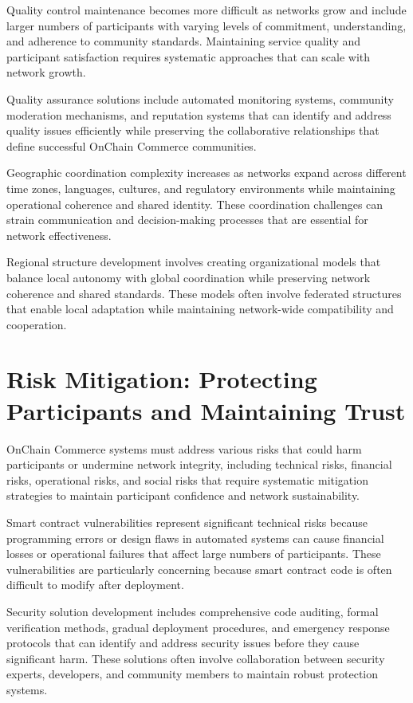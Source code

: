 \documentclass[
  Letterpaper,
]{scrbook}
\begin{document}
Quality control maintenance becomes more difficult as networks grow and
include larger numbers of participants with varying levels of
commitment, understanding, and adherence to community standards.
Maintaining service quality and participant satisfaction requires
systematic approaches that can scale with network growth.

Quality assurance solutions include automated monitoring systems,
community moderation mechanisms, and reputation systems that can
identify and address quality issues efficiently while preserving the
collaborative relationships that define successful OnChain Commerce
communities.

Geographic coordination complexity increases as networks expand across
different time zones, languages, cultures, and regulatory environments
while maintaining operational coherence and shared identity. These
coordination challenges can strain communication and decision-making
processes that are essential for network effectiveness.

Regional structure development involves creating organizational models
that balance local autonomy with global coordination while preserving
network coherence and shared standards. These models often involve
federated structures that enable local adaptation while maintaining
network-wide compatibility and cooperation.

\section{Risk Mitigation: Protecting Participants and Maintaining
Trust}\label{risk-mitigation-protecting-participants-and-maintaining-trust}

OnChain Commerce systems must address various risks that could harm
participants or undermine network integrity, including technical risks,
financial risks, operational risks, and social risks that require
systematic mitigation strategies to maintain participant confidence and
network sustainability.

Smart contract vulnerabilities represent significant technical risks
because programming errors or design flaws in automated systems can
cause financial losses or operational failures that affect large numbers
of participants. These vulnerabilities are particularly concerning
because smart contract code is often difficult to modify after
deployment.

Security solution development includes comprehensive code auditing,
formal verification methods, gradual deployment procedures, and
emergency response protocols that can identify and address security
issues before they cause significant harm. These solutions often involve
collaboration between security experts, developers, and community
members to maintain robust protection systems.
\end{document}
